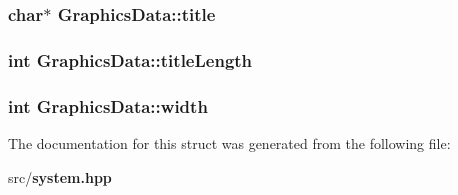 \subsubsection{\setlength{\rightskip}{0pt plus 5cm}char$\ast$ {\bf Graphics\-Data::title}}\label{structGraphicsData_o6}


\subsubsection{\setlength{\rightskip}{0pt plus 5cm}int {\bf Graphics\-Data::title\-Length}}\label{structGraphicsData_o8}


\subsubsection{\setlength{\rightskip}{0pt plus 5cm}int {\bf Graphics\-Data::width}}\label{structGraphicsData_o2}




The documentation for this struct was generated from the following file:\begin{CompactItemize}
\item 
src/{\bf system.hpp}\end{CompactItemize}
